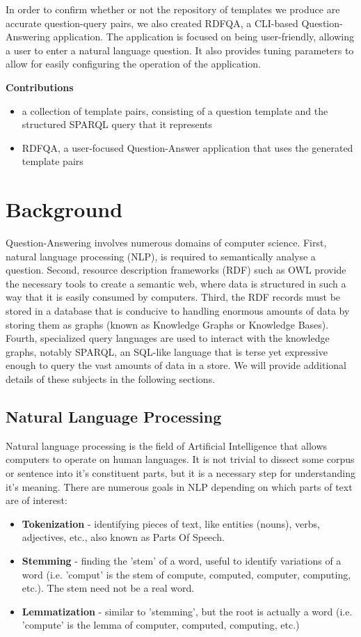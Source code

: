 \documentclass[sigplan,screen]{acmart}
\begin{document}
In order to confirm whether or not the repository of templates we produce are accurate question-query pairs, we also created RDFQA, a CLI-based Question-Answering application. The application is focused on being user-friendly, allowing a user to enter a natural language question. It also provides tuning parameters to allow for easily configuring the operation of the application.

\textbf{Contributions}

\begin{itemize}
    \item a collection of template pairs, consisting of a question template and the structured SPARQL query that it represents
    \item RDFQA, a user-focused Question-Answer application that uses the generated template pairs
\end{itemize}

\section{Background}

Question-Answering involves numerous domains of computer science. First, natural language processing (NLP), is required to semantically analyse a question. Second, resource description frameworks (RDF) such as OWL provide the necessary tools to create a semantic web, where data is structured in such a way that it is easily consumed by computers. Third, the RDF records must be stored in a database that is conducive to handling enormous amounts of data by storing them as graphs (known as Knowledge Graphs or Knowledge Bases). Fourth, specialized query languages are used to interact with the knowledge graphs, notably SPARQL, an SQL-like language that is terse yet expressive enough to query the vast amounts of data in a store. We will provide additional details of these subjects in the following sections.

\subsection{Natural Language Processing}

Natural language processing is the field of Artificial Intelligence that allows computers to operate on human languages. It is not trivial to dissect some corpus or sentence into it's constituent parts, but it is a necessary step for understanding it's meaning. There are numerous goals in NLP depending on which parts of text are of interest:
\begin{itemize}
    \item \textbf{Tokenization} - identifying pieces of text, like entities (nouns), verbs, adjectives, etc., also known as Parts Of Speech.
    \item \textbf{Stemming} - finding the 'stem' of a word, useful to identify variations of a word (i.e. 'comput' is the stem of compute, computed, computer, computing, etc.). The stem need not be a real word.
    \item \textbf{Lemmatization} - similar to 'stemming', but the root is actually a word (i.e. 'compute' is the lemma of computer, computed, computing, etc.)
\end{itemize}
\end{document}
